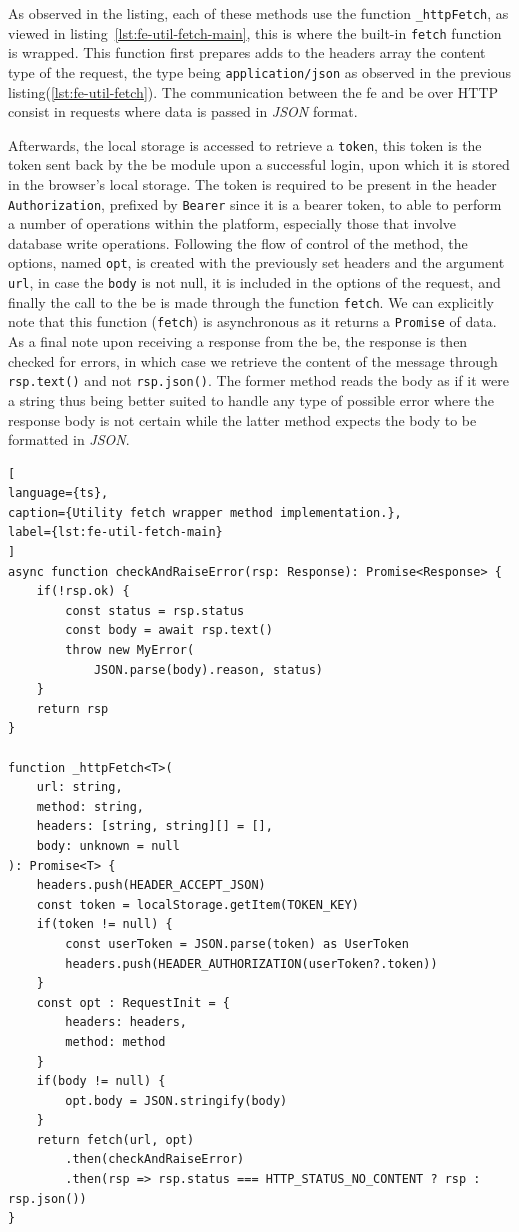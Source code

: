As observed in the listing, each of these methods use the function \lstinline{_httpFetch}, as viewed in listing~\ref{lst:fe-util-fetch-main}, this is where the built-in \lstinline{fetch} function is wrapped. This function first prepares adds to the headers array the content type of the request, the type being \lstinline{application/json} as observed in the previous listing(\ref{lst:fe-util-fetch}). The communication between the \acrshort{fe} and \acrshort{be} over HTTP consist in requests where data is passed in \textit{JSON} format.

Afterwards, the local storage is accessed to retrieve a \lstinline{token}, this token is the token sent back by the \acrshort{be} module upon a successful login, upon which it is stored in the browser's local storage.
The token is required to be present in the header \lstinline{Authorization}, prefixed by \texttt{Bearer} since it is a bearer token, to able to perform a number of operations within the platform, especially those that involve database write operations. Following the flow of control of the method, the options, named \lstinline{opt}, is created with the previously set headers and the argument \lstinline{url}, in case the \lstinline{body} is not null, it is included in the options of the request, and finally the call to the \acrshort{be} is made through the function \lstinline{fetch}. We can explicitly note that this function (\lstinline{fetch}) is asynchronous as it returns a \lstinline{Promise} of data. As a final note upon receiving a response from the \acrshort{be}, the response is then checked for errors, in which case we retrieve the content of the message through \lstinline{rsp.text()} and not \lstinline{rsp.json()}. The former method reads the body as if it were a string thus being better suited to handle any type of possible error where the response body is not certain while the latter method expects the body to be formatted in \textit{JSON}.

\begin{lstlisting}[
language={ts},
caption={Utility fetch wrapper method implementation.},
label={lst:fe-util-fetch-main}
]
async function checkAndRaiseError(rsp: Response): Promise<Response> {
    if(!rsp.ok) {
        const status = rsp.status
        const body = await rsp.text()
        throw new MyError(
            JSON.parse(body).reason, status)
    }
    return rsp
}

function _httpFetch<T>(
    url: string,
    method: string,
    headers: [string, string][] = [],
    body: unknown = null
): Promise<T> {
    headers.push(HEADER_ACCEPT_JSON)
    const token = localStorage.getItem(TOKEN_KEY)
    if(token != null) {
        const userToken = JSON.parse(token) as UserToken
        headers.push(HEADER_AUTHORIZATION(userToken?.token))
    }
    const opt : RequestInit = {
        headers: headers,
        method: method
    }
    if(body != null) {
        opt.body = JSON.stringify(body)
    }
    return fetch(url, opt)
        .then(checkAndRaiseError)
        .then(rsp => rsp.status === HTTP_STATUS_NO_CONTENT ? rsp : rsp.json())
}
\end{lstlisting}



